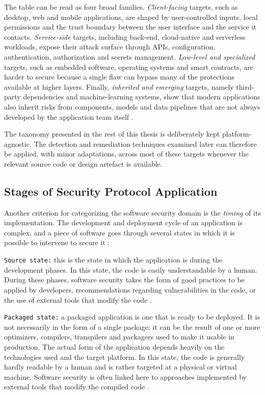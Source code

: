 The table can be read as four broad families. \emph{Client-facing}
targets, such as desktop, web and mobile applications, are shaped by
user-controlled inputs, local permissions and the trust boundary between
the user interface and the service it contacts. \emph{Service-side}
targets, including back-end, cloud-native and serverless workloads, expose
their attack surface through APIs, configuration, authentication,
authorization and secrets management. \emph{Low-level and specialized}
targets, such as embedded software, operating systems and smart contracts,
are harder to secure because a single flaw can bypass many of the
protections available at higher layers. Finally, \emph{inherited and
emerging} targets, namely third-party dependencies and machine-learning
systems, show that modern applications also inherit risks from components,
models and data pipelines that are not always developed by the application
team itself \citep{placeholder-sast,placeholder-sca}.

The taxonomy presented in the rest of this thesis is deliberately kept
platform-agnostic. The detection and remediation techniques examined later
can therefore be applied, with minor adaptations, across most of these
targets whenever the relevant source code or design artefact is available.

\subsection{Stages of Security Protocol Application}
\label{subsec:stages}

Another criterion for categorizing the software security domain is the
\emph{timing} of its implementation. The development and deployment cycle
of an application is complex, and a piece of software goes through several
states in which it is possible to intervene to secure it
\citep{placeholder-sast}:

\texttt{Source state:} this is the state in which the application is
during the development phases. In this state, the code is easily
understandable by a human. During these phases, software security takes the
form of good practices to be applied by developers, recommendations
regarding vulnerabilities in the code, or the use of external tools that
modify the code \citep{placeholder-sast}.

\texttt{Packaged state:} a packaged application is one that is ready to
be deployed. It is not necessarily in the form of a single package: it can
be the result of one or more optimizers, compilers, transpilers and
packagers used to make it usable in production. The actual form of the
application depends heavily on the technologies used and the target
platform. In this state, the code is generally hardly readable by a human
and is rather targeted at a physical or virtual machine. Software security
is often linked here to approaches implemented by external tools that
modify the compiled code \citep{placeholder-sast}.

